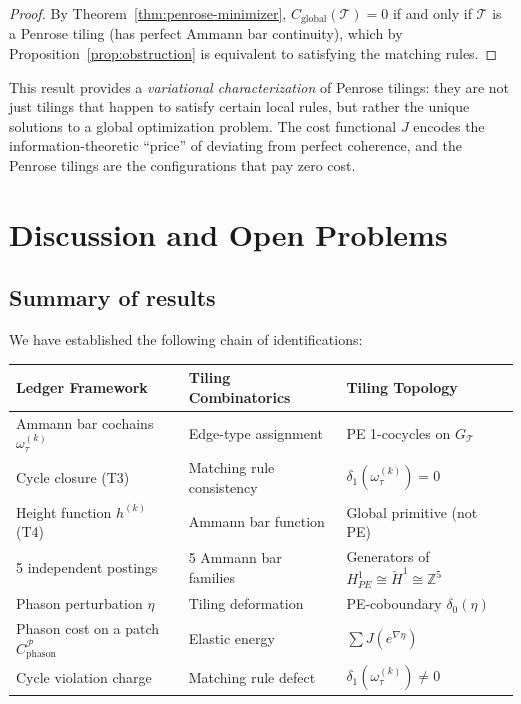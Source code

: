 \documentclass[12pt]{article}
\theoremstyle{definition}
\theoremstyle{remark}
\newcommand{\ZZ}{\mathbb{Z}}
\newcommand{\Hcech}{\check{H}}
\begin{document}
\begin{proof}
By Theorem~\ref{thm:penrose-minimizer}, $C_{\text{global}}(\mathcal{T}) = 0$ if and only if $\mathcal{T}$ is a Penrose tiling (has perfect Ammann bar continuity), which by Proposition~\ref{prop:obstruction} is equivalent to satisfying the matching rules.
\end{proof}

This result provides a \emph{variational characterization} of Penrose tilings: they are not just tilings that happen to satisfy certain local rules, but rather the unique solutions to a global optimization problem. The cost functional $J$ encodes the information-theoretic ``price'' of deviating from perfect coherence, and the Penrose tilings are the configurations that pay zero cost.

\section{Discussion and Open Problems}
\label{sec:discussion}

\subsection{Summary of results}

We have established the following chain of identifications:

\begin{center}
\begin{tabular}{p{}p{}p{}}
\hline
\textbf{Ledger Framework} & \textbf{Tiling Combinatorics} & \textbf{Tiling Topology} \\ \hline
Ammann bar cochains $\omega_\tau^{(k)}$ & Edge-type assignment & PE 1-cocycles on $G_{\mathcal{T}}$ \\[4pt]
Cycle closure (T3) & Matching rule consistency & $\delta_1(\omega_\tau^{(k)}) = 0$ \\[4pt]
Height function $h^{(k)}$ (T4) & Ammann bar function & Global primitive (not PE) \\[4pt]
5 independent postings & 5 Ammann bar families & Generators of $H^1_{PE} \cong \Hcech^1 \cong \ZZ^5$ \\[4pt]
Phason perturbation $\eta$ & Tiling deformation & PE-coboundary $\delta_0(\eta)$ \\[4pt]
Phason cost on a patch $C^{\mathcal{P}}_{\text{phason}}$ & Elastic energy & $\sum J(e^{\nabla\eta})$ \\[4pt]
Cycle violation charge & Matching rule defect & $\delta_1(\omega_\tau^{(k)}) \neq 0$ \\
\hline
\end{tabular}
\end{center}
\end{document}
